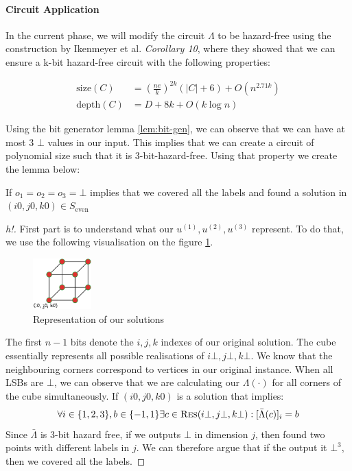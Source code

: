 \paragraph{Circuit Application}

In the current phase, we will modify the circuit $\Lambda$ to be hazard-free using the construction
by Ikenmeyer et al. \cite{ikenmeyer_ComplexityHazardfreeCircuits_2019} \textit{Corollary 10}, where
they showed that we can ensure a k-bit hazard-free circuit with the following properties:

\begin{align*}
\text{size}(C)  & =  \left( \frac{ne}{k}  \right)^{2k} (|C| + 6) + O (n^{2.71k}) \\
\text{depth}(C)  & =  D + 8k + O(k \log n)
\end{align*}

Using the bit generator lemma \ref{lem:bit-gen}, we can observe that we can have at most 3 $\bot$ values 
in our input. This implies that we can create a circuit of polynomial size such that it is 3-bit-hazard-free.
Using that property we create the lemma below:

\begin{lemma}
    \label{lem:circuit}
    If $o_1 = o_2 = o_3 = \bot$ implies that we covered all the labels and found a solution
    in $(i0,j0,k0) \in S_{\text{even}}$
\end{lemma}


\begin{proof}[h!]
    First part is to understand what our $u^{(1)}, u^{(2)}, u^{(3)}$
    represent. To do that, we use the following visualisation on the figure \ref{fig:main-proof:cube-vis}.
    \begin{figure}[h!]
        \centering
        \includegraphics[width=0.2\textwidth]{assets/3d-cube.png}
        \caption{Representation of our solutions}\label{fig:main-proof:cube-vis}
    \end{figure}
    The first $n-1$ bits denote the $i,j,k$ indexes of our original solution.
    The cube essentially represents all possible realisations of $i\bot, j\bot, k\bot$.
    We know that the neighbouring corners correspond to vertices in our original instance.
    When all LSBs are $\bot$, we can observe that we are calculating our $\Lambda(\cdot)$
    for all corners of the cube simultaneously. If $(i0, j0, k0)$ is a solution
    that implies:
    $$
    \forall i \in \{1,2,3\}, b \in \{-1, 1\} \exists c \in \textsc{Res}(i\bot, j\bot, k\bot): [\bar{\Lambda}(c)]_i = b
    $$
    Since $\bar{\Lambda}$ is 3-bit hazard free, if we outputs $\bot$ in dimension $j$, then found two points with different labels in $j$. We can therefore
    argue that if the output it $\bot^3$, then we covered all the labels.
\end{proof}


